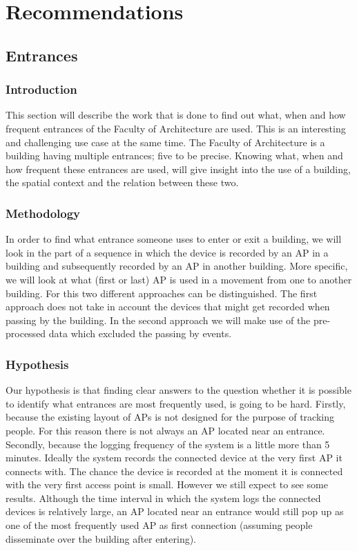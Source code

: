 \chapter{Recommendations}\label{recommendations}
\section{Entrances}
\subsection{Introduction}\label{intro}
This section will describe the work that is done to find out what, when and how frequent entrances of the Faculty of Architecture are used. This is an interesting and challenging use case at the same time. The Faculty of Architecture is a building having multiple entrances; five to be precise. Knowing what, when and how frequent these entrances are used, will give insight into the use of a building, the spatial context and the relation between these two.
\subsection{Methodology}\label{method}
In order to find what entrance someone uses to enter or exit a building, we will look in the part of a sequence in which the device is recorded by an AP in a building and subsequently recorded by an AP in another building. More specific, we will look at what (first or last) AP is used in a movement from one to another building. For this two different approaches can be distinguished. The first approach does not take in account the devices that might get recorded when passing by the building. In  the second approach we will make use of the pre-processed data which excluded the passing by events.
\subsection{Hypothesis}\label{hypo}
Our hypothesis is that finding clear answers to the question whether it is possible to identify what entrances are most frequently used, is going to be hard. Firstly, because the existing layout of APs is not designed for the purpose of tracking people. For this reason there is not always an AP located near an entrance. Secondly, because the logging frequency of the system is a little more than 5 minutes. Ideally the system records the connected device at the very first AP it connects with. The chance the device is recorded at the moment it is connected with the very first access point is small. However we still expect to see some results. Although the time interval in which the system logs the connected devices is relatively large, an AP located near an entrance would still pop up as one of the most frequently used AP as first connection (assuming people disseminate over the building after entering). 
